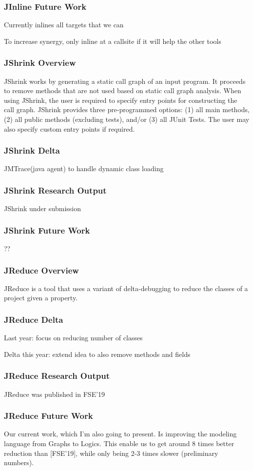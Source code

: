 \documentclass[aspectratio=169]{beamer}
\begin{document}
  \begin{frame}
    \frametitle{JInline Future Work}
    Currently inlines all targets that we can

    To increase synergy, only inline at a callsite if it will help the other
    tools
  \end{frame}

  \begin{frame}
    \frametitle{JShrink Overview}
    JShrink works by generating a static call graph of an input program.
    It proceeds to remove methods that are not used based on static call graph
    analysis.
    When using JShrink, the user is required to specify entry points for
    constructing the call graph.
    JShrink provides three pre-programmed options: (1) all main methods, (2) all
    public methods (excluding tests), and/or (3) all JUnit Tests. The user may
    also specify custom entry points if required.
  \end{frame}

  \begin{frame}
    \frametitle{JShrink Delta}
    JMTrace(java agent) to handle dynamic class loading
  \end{frame}

  \begin{frame}
    \frametitle{JShrink Research Output}

    JShrink under submission
  \end{frame}

  \begin{frame}
    \frametitle{JShrink Future Work}
        ??
  \end{frame}

  \begin{frame}
    \frametitle{JReduce Overview}
    JReduce is a tool that uses a variant of delta-debugging to reduce the
    classes of a project given a property.
  \end{frame}

  \begin{frame}
    \frametitle{JReduce Delta}

    Last year: focus on reducing number of classes

    Delta this year: extend idea to also remove methods and fields
  \end{frame}

  \begin{frame}
    \frametitle{JReduce Research Output}

    JReduce was published in FSE'19
  \end{frame}

  \begin{frame}
    \frametitle{JReduce Future Work}

    Our current work, which I'm also going to present. Is improving the
    modeling language from Graphs to Logics. This enable us to get around 8
    times better reduction than [FSE'19], while only being 2-3 times slower
    (preliminary numbers).
  \end{frame}
\end{document}
